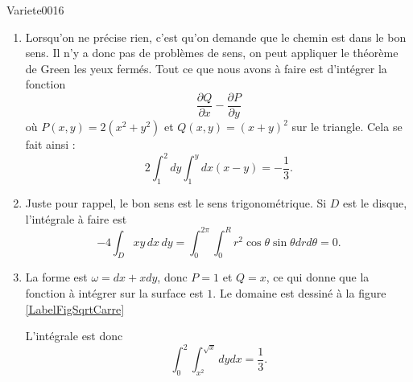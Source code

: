 
\begin{corrige}{Variete0016}

	\begin{enumerate}

		\item
			Lorsqu'on ne précise rien, c'est qu'on demande que le chemin est dans le \og bon\fg{} sens. Il n'y a donc pas de problèmes de sens, on peut appliquer le théorème de Green les yeux fermés. Tout ce que nous avons à faire est d'intégrer la fonction
			\begin{equation}
				\frac{ \partial Q }{ \partial x }-\frac{ \partial P }{ \partial y }
			\end{equation}
			où $P(x,y)=2(x^2+y^2)$ et $Q(x,y)=(x+y)^2$ sur le triangle. Cela se fait ainsi :
			\begin{equation}
				2\int_1^2dy\int_1^ydx(x-y)=-\frac{ 1 }{ 3 }.
			\end{equation}
			
		\item
			Juste pour rappel, le bon sens est le sens trigonométrique. Si $D$ est le disque, l'intégrale à faire est
			\begin{equation}
				-4\int_Dxy\,dx\,dy=\int_0^{2\pi}\int_0^R r^2\cos\theta\sin\theta drd\theta=0.
			\end{equation}
			
		\item
			La forme est $\omega=dx+xdy$, donc $P=1$ et $Q=x$, ce qui donne que la fonction à intégrer sur la surface est $1$. Le domaine est dessiné à la figure 
			\ref{LabelFigSqrtCarre}
			\newcommand{\CaptionFigSqrtCarre}{Le domaine d'intégration pour l'exercice \ref{exoVariete0016}.}
			
			L'intégrale est donc
			\begin{equation}
				\int_0^2\int_{x^2}^{\sqrt{x}}dydx=\frac{1}{ 3 }.
			\end{equation}


\end{enumerate}
\end{corrige}

